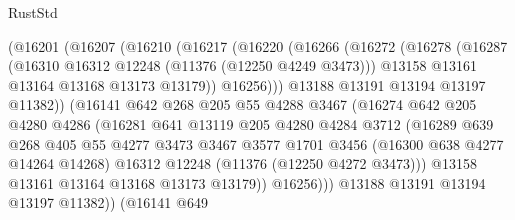 \begin{lexlean}{RustStd}
\begin{coremodule}
{\begin{coremodule}
{{{{{{{{{{{{{{{{{{{{{{{{{{{{{{{{{{{{{{{{{{{{{{{{{{{{{{{{{{{{{{{{{{{{{{{{{{{{{{{{{{{{{                    (@16201
                      (@16207
                        (@16210
                          (@16217
                            (@16220
                              (@16266
                                (@16272
                                  (@16278
                                    (@16287
                                      (@16310 @16312 @12248 (@11376 (@12250 @4249 @3473)))
                                      @13158
                                      @13161
                                      @13164
                                      @13168
                                      @13173
                                      @13179))
                                  @16256)))
                            @13188
                            @13191
                            @13194
                            @13197
                            @11382))
                        (@16141
                          @642
                          @268
                          @205
                          @55
                          @4288
                          @3467
                          (@16274
                            @642
                            @205
                            @4280
                            @4286
                            (@16281
                              @641
                              @13119
                              @205
                              @4280
                              @4284
                              @3712
                              (@16289
                                @639
                                @268
                                @405
                                @55
                                @4277
                                @3473
                                @3467
                                @3577
                                @1701
                                @3456
                                (@16300 @638 @4277 @14264 @14268)
                                @16312
                                @12248
                                (@11376 (@12250 @4272 @3473)))
                              @13158
                              @13161
                              @13164
                              @13168
                              @13173
                              @13179))
                          @16256)))
                    @13188
                    @13191
                    @13194
                    @13197
                    @11382))
                (@16141
                  @649
}}}}}}}}}}}}}}}}}}}}}}}}}}}}}}}}}}}}}}}}}}}}}}}}}}}}}}}}}}}}}}}}}}}}}}}}}}}}}}}}}}}}}
\end{coremodule}}
\end{coremodule}
\end{lexlean}
